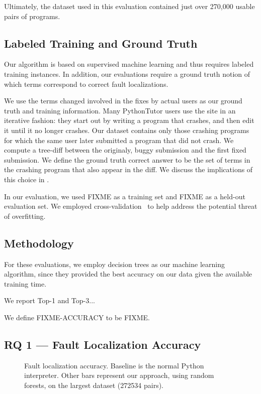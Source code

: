 \documentclass[conference]{IEEEtran}
\begin{document}
Ultimately, the dataset used in this evaluation contained just over
270,000 usable pairs of programs.

\subsection{Labeled Training and Ground Truth}

Our algorithm is based on supervised machine learning and thus requires
labeled training instances. In addition, our evaluations require a ground
truth notion of which terms correspond to correct fault localizations.

We use the terms changed involved in the fixes by actual users as our
ground truth and training information.  Many PythonTutor users use the site
in an iterative fashion: they start out by writing a program that crashes,
and then edit it until it no longer crashes. Our dataset contains only
those crashing programs for which the same user later submitted a program
that did not crash. We compute a tree-diff \cite{tree-diff} between the
originaly, buggy submission and the first fixed submission. We define
the ground truth correct answer to be the set of terms in the crashing
program that also appear in the diff. We discuss the implications of this
choice in .

In our evaluation, we used FIXME as a training set and FIXME as a held-out
evaluation set. We employed cross-validation~\cite{kohavi} to help address
the potential threat of overfitting.

\subsection{Methodology}

For these evaluations, we employ decision trees as our machine learning
algorithm, since they provided the best accuracy on our data given the
available training time.

We report Top-1 and Top-3...

We define FIXME-ACCURACY to be FIXME.

\subsection{RQ 1 --- Fault Localization Accuracy}

\begin{figure}
\caption{Fault localization accuracy.
Baseline is the normal Python interpreter. Other bars represent
our approach, using random forests,
on the largest dataset (272534 pairs).}
\label{fig-full-dataset-acc-random-forest}
\end{figure}
\end{document}
